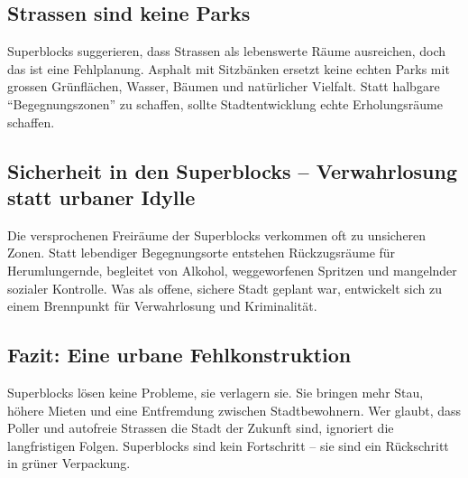 \begin{tcolorbox}[title=Kontra-Argumente,
			parbox=false,
			colback=Crimson!10,
			colframe=Crimson,
			colbacktitle=Crimson]
\subsection*{Strassen sind keine Parks}
Superblocks suggerieren, dass Strassen als lebenswerte Räume ausreichen, doch das ist eine Fehlplanung. Asphalt mit Sitzbänken ersetzt keine echten Parks mit grossen Grünflächen, Wasser, Bäumen und natürlicher Vielfalt. Statt halbgare ``Begegnungszonen'' zu schaffen, sollte Stadtentwicklung echte Erholungsräume schaffen.

\subsection*{Sicherheit in den Superblocks – Verwahrlosung statt urbaner Idylle}
Die versprochenen Freiräume der Superblocks verkommen oft zu unsicheren Zonen. Statt lebendiger Begegnungsorte entstehen Rückzugsräume für Herumlungernde, begleitet von Alkohol, weggeworfenen Spritzen und mangelnder sozialer Kontrolle. Was als offene, sichere Stadt geplant war, entwickelt sich zu einem Brennpunkt für Verwahrlosung und Kriminalität.

\subsection*{Fazit: Eine urbane Fehlkonstruktion}

Superblocks lösen keine Probleme, sie verlagern sie. Sie bringen mehr Stau, höhere Mieten und eine Entfremdung zwischen Stadtbewohnern. Wer glaubt, dass Poller und autofreie Strassen die Stadt der Zukunft sind, ignoriert die langfristigen Folgen. Superblocks sind kein Fortschritt – sie sind ein Rückschritt in grüner Verpackung.


\end{tcolorbox}
\newpage

